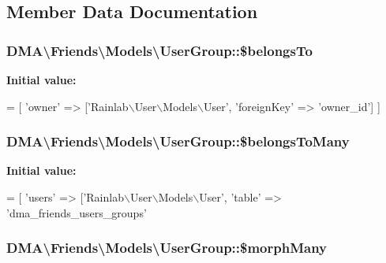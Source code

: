 \subsection{Member Data Documentation}
\hypertarget{classDMA_1_1Friends_1_1Models_1_1UserGroup_a941362fd666e66db70f4b5951cba0154}{
\subsubsection[{\$belongs\+To}]{\setlength{\rightskip}{0pt plus 5cm}D\+M\+A\textbackslash{}\+Friends\textbackslash{}\+Models\textbackslash{}\+User\+Group\+::\$belongs\+To}}\label{classDMA_1_1Friends_1_1Models_1_1UserGroup_a941362fd666e66db70f4b5951cba0154}
{\bfseries Initial value\+:}
\begin{DoxyCode}
= [
        \textcolor{stringliteral}{'owner'} => [\textcolor{stringliteral}{'Rainlab\(\backslash\)User\(\backslash\)Models\(\backslash\)User'}, \textcolor{stringliteral}{'foreignKey'} => \textcolor{stringliteral}{'owner\_id'}]    
    ]
\end{DoxyCode}
\hypertarget{classDMA_1_1Friends_1_1Models_1_1UserGroup_a09a5f57f3092a3bf0aa240cf8ca949a8}{
\subsubsection[{\$belongs\+To\+Many}]{\setlength{\rightskip}{0pt plus 5cm}D\+M\+A\textbackslash{}\+Friends\textbackslash{}\+Models\textbackslash{}\+User\+Group\+::\$belongs\+To\+Many}}\label{classDMA_1_1Friends_1_1Models_1_1UserGroup_a09a5f57f3092a3bf0aa240cf8ca949a8}
{\bfseries Initial value\+:}
\begin{DoxyCode}
= [
        \textcolor{stringliteral}{'users'} => [\textcolor{stringliteral}{'Rainlab\(\backslash\)User\(\backslash\)Models\(\backslash\)User'}, 
        \textcolor{stringliteral}{'table'} => \textcolor{stringliteral}{'dma\_friends\_users\_groups'}
\end{DoxyCode}
\hypertarget{classDMA_1_1Friends_1_1Models_1_1UserGroup_ad71c8521c1767d621fe10ea3ce822c3c}{
\subsubsection[{\$morph\+Many}]{\setlength{\rightskip}{0pt plus 5cm}D\+M\+A\textbackslash{}\+Friends\textbackslash{}\+Models\textbackslash{}\+User\+Group\+::\$morph\+Many}}\label{classDMA_1_1Friends_1_1Models_1_1UserGroup_ad71c8521c1767d621fe10ea3ce822c3c}
